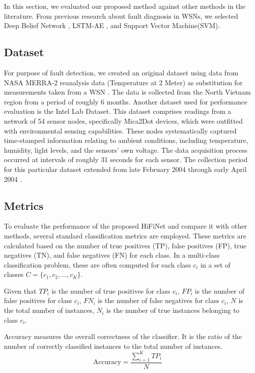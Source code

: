In this section, we evaluated our proposed method against other methods in the literature. From previous research about fault diagnosis in WSNs, we selected  Deep Belief Network \cite{Prasad2023}, LSTM-AE \cite{Khan2024}, and Support Vector Machine(SVM).

\subsection{Dataset}
For purpose of fault detection, we created an original dataset using data from NASA MERRA-2 reanalysis data (Temperature at 2 Meter) as substitution for measurements taken from a WSN \cite{GMAO2015}. The data is collected from the North Vietnam region from a period of roughly 6 months. Another dataset used for performance evaluation is the Intel Lab Dataset. This dataset comprises readings from a network of 54 sensor nodes, specifically Mica2Dot devices, which were outfitted with environmental sensing capabilities. These nodes systematically captured time-stamped information relating to ambient conditions, including temperature, humidity, light levels, and the sensors' own voltage. The data acquisition process occurred at intervals of roughly 31 seconds for each sensor. The collection period for this particular dataset extended from late February 2004 through early April 2004 \cite{Intel2004}.

\subsection{Metrics}
To evaluate the performance of the proposed HiFiNet and compare it with other methods, several standard classification metrics are employed. These metrics are calculated based on the number of true positives (TP), false positives (FP), true negatives (TN), and false negatives (FN) for each class. In a multi-class classification problem, these are often computed for each class $c_i$ in a set of classes $C = \{c_1, c_2, \dots, c_K\}$.

Given that \(TP_i\) is the number of true positives for class \(c_i\), \(FP_i\) is the number of false positives for class \(c_i\), \(FN_i\) is the number of false negatives for class \(c_i\), \(N\) is the total number of instances, \(N_i\) is the number of true instances belonging to class \(c_i\).

Accuracy measures the overall correctness of the classifier. It is the ratio of the number of correctly classified instances to the total number of instances.
\begin{equation}
  \text{Accuracy} = \frac{\sum_{i=1}^{K} TP_i}{N}
\end{equation}

